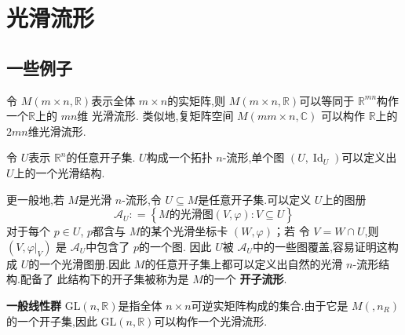 \documentclass[../../几何与拓扑.tex]{subfiles}
\begin{document}
    
\chapter{光滑流形}

\section{一些例子}

\begin{example}[矩阵空间]
    令 \(  M\left( m\times n,\mathbb{R}  \right)   \)表示全体 \(  m\times n  \)的实矩阵,则 \(  M\left( m\times n,\mathbb{R}  \right)   \)可以等同于 \(  \mathbb{R} ^{mn}  \)构作一个\(  \mathbb{R}   \)上的 \(  mn  \)维  光滑流形.
    类似地,复矩阵空间 \(  M\left( mm\times n,\mathbb{C} \right)   \) 可以构作 \(  \mathbb{R}   \)上的 \(  2mn  \)维光滑流形.  
\end{example}

\hspace*{\fill} 

\begin{example}[开子流形]\label{开子流形}
    令 \(  U  \)表示 \(  \mathbb{R} ^{n}  \)的任意开子集. \(  U  \)构成一个拓扑 \(  n  \)-流形,单个图 \(  \left( U,\operatorname{Id}_{U} \right)   \)可以定义出 \(  U  \)上的一个光滑结构.
    
    更一般地,若 \(  M  \)是光滑 \(  n  \)-流形,令 \(  U\subseteq M  \)是任意开子集.可以定义 \(  U  \)上的图册 \[
    \mathcal{A}_{U}: =  \left\{     M  \text{的光滑图} \left( V,\varphi  \right) : V\subseteq U \right\}
    \]    对于每个 \(  p \in U  \), \(  p  \)都含与 \(  M  \)的某个光滑坐标卡 \(  \left( W, \varphi  \right)   \)；若
    令 \(  V =  W\cap U  \),则 \(  \left( V, \varphi |_{V} \right)   \)      是 \(  \mathcal{A}_{U}  \)中包含了 \(  p  \)的一个图.
    因此 \(  U  \)被 \(  \mathcal{A}_{U}  \)中的一些图覆盖,容易证明这构成 \(  U  \)的一个光滑图册.因此 \(  M  \)的任意开子集上都可以定义出自然的光滑 \(  n  \)-流形结构.配备了
    此结构下的开子集被称为是 \(  M  \)的一个 \textbf{开子流形}.        
\end{example}

\hspace*{\fill} 

\begin{example}[一般线性群]\label{一般线性群}
    \textbf{一般线性群} \(  \mathrm{GL}\left( n,\mathbb{R}  \right)   \)是指全体 \(  n\times n  \)可逆实矩阵构成的集合.由于它是 \(  M\left( ,n_{R} \right)   \)的一个开子集,因此
     \(  \mathrm{GL}\left( n,\mathbb{R}  \right)   \)可以构作一个光滑流形.    
\end{example}

\hspace*{\fill} 
\end{document}
